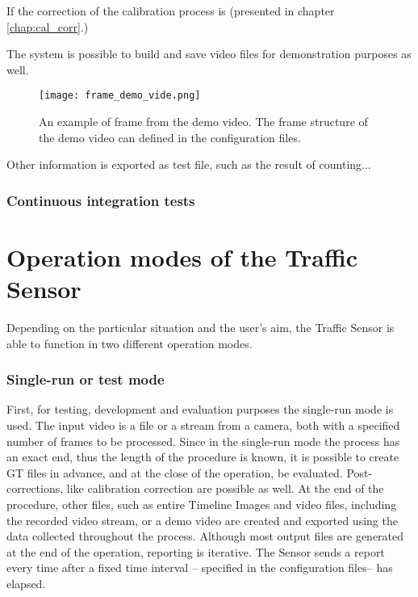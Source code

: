 If the correction of the calibration process is (presented in chapter \ref{chap:cal_corr}.)

The system is possible to build and save video files for demonstration purposes as well. 

\begin{figure}[!h]
	\centering
	\texttt{[image: frame\_demo\_vide.png]}
	\caption{An example of frame from the demo video. The frame structure of the demo video can defined in the configuration files.  \label{fig:demo_video}}
\end{figure}

Other information is exported as test file, such as the result of counting...

\subsubsection{Continuous integration tests}

\section{Operation modes of the Traffic Sensor}\label{chap:operation_modes}
Depending on the particular situation and the user's aim, the Traffic Sensor is able to function in two different operation modes.
\subsubsection{Single-run or test mode}\label{sec:run_modes}
First, for testing, development and evaluation purposes the single-run mode is used.
The input video is a file or a stream from a camera, both with a specified number of frames to be processed.
Since in the single-run mode the process has an exact end, thus the length of the procedure is known, it is possible to create GT files in advance, and at the close of the operation, be evaluated.
Post-corrections, like calibration correction are possible as well.
At the end of the procedure, other files, such as entire Timeline Images and video files, including the recorded video stream, or a demo video are created and exported using the data collected throughout the process.
Although most output files are generated at the end of the operation, reporting is iterative.
The Sensor sends a report every time after a fixed time interval -- specified in the configuration files-- has elapsed.

